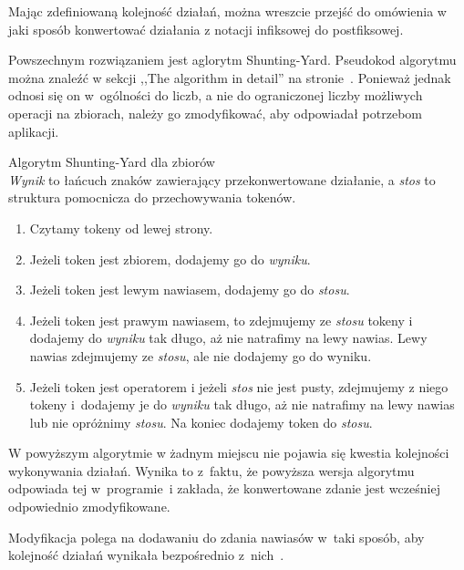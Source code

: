 \documentclass{SGGW-thesis}
\begin{document}
\begin{paragraph}{}
    Mając zdefiniowaną kolejność działań, można wreszcie przejść do omówienia w jaki sposób konwertować działania z notacji infiksowej do postfiksowej.

    Powszechnym rozwiązaniem jest aglorytm Shunting-Yard. Pseudokod algorytmu można znaleźć w sekcji ,,The algorithm in detail'' na stronie~\cite{wiki:Shunting_yard_algorithm}. Ponieważ jednak odnosi się on w~ogólności do liczb, a nie do ograniczonej liczby możliwych operacji na zbiorach, należy go zmodyfikować, aby odpowiadał potrzebom aplikacji.
\end{paragraph}

\begin{paragraph}{Algorytm Shunting-Yard dla zbiorów\\}
    \emph{Wynik} to łańcuch znaków zawierający przekonwertowane działanie, a \emph{stos} to struktura pomocnicza do przechowywania tokenów.

    \begin{enumerate}
        \item Czytamy tokeny od lewej strony.
        \item Jeżeli token jest zbiorem, dodajemy go do \emph{wyniku}.
        \item Jeżeli token jest lewym nawiasem, dodajemy go do \emph{stosu}.
        \item Jeżeli token jest prawym nawiasem, to zdejmujemy ze \emph{stosu} tokeny i dodajemy do \emph{wyniku} tak długo, aż nie natrafimy na lewy nawias. Lewy nawias zdejmujemy ze \emph{stosu}, ale nie dodajemy go do wyniku.
        \item Jeżeli token jest operatorem i jeżeli \emph{stos} nie jest pusty, zdejmujemy z niego tokeny i~dodajemy je do \emph{wyniku} tak długo, aż nie natrafimy na lewy nawias lub nie opróżnimy \emph{stosu}. Na koniec dodajemy token do \emph{stosu}.
    \end{enumerate}

    W powyższym algorytmie w żadnym miejscu nie pojawia się kwestia kolejności wykonywania działań. Wynika to z~faktu, że powyższa wersja algorytmu odpowiada tej w~programie~i zakłada, że konwertowane zdanie jest wcześniej odpowiednio zmodyfikowane.

    Modyfikacja polega na dodawaniu do zdania nawiasów w~taki sposób, aby kolejność działań wynikała bezpośrednio z~nich~\cite{wiki:Operator-precedence_parser}.
\end{paragraph}
\end{document}
